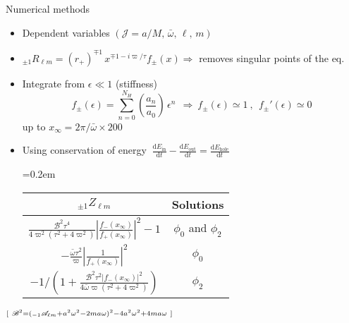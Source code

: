 \documentclass[9pt]{beamer}
\newcommand{\dd}{\mathrm{d}}
\newcommand{\uu}[3][]{ {}_{#1} #2_{#3} }
\begin{document}
\begin{frame}{Numerical methods}
	\begin{itemize}
		\setlength\itemsep{0.8em}

		\item Dependent variables $(\mathscr{J} = a/M, \,\bar{\omega}, \, \ell, \, m)$
		
		\item $\uu[\pm 1]{R}{\ell m} = (r_+)^{\mp 1} \, x^{ \mp 1 - i \varpi / \tau} f_{\pm}(x) \Rightarrow$ removes singular points of the eq.
		
		\item
		Integrate from $\epsilon\ll 1$ (stiffness) 
		$$ f_{\pm}(\epsilon) = \sum_{n=0}^{N_H} \left(\frac{a_n}{a_0}\right)
		\,\epsilon^n ~~\Rightarrow~ f_{\pm}{}(\epsilon) \simeq 1 ~,~~ f_{\pm}{}'(\epsilon) \simeq 0$$
		up to $x_\infty = 2\pi/\bar{\omega} \times 200$
		
		\item
		Using conservation of energy $~\frac{\dd E_\mathrm{in}}{\dd t} - \frac{\dd E_\mathrm{out}}{\dd t} = \frac{\dd E_\mathrm{hole}}{\dd t}$
		\\[0.2cm]
		\begin{center}
			\tabulinesep=0.2em
			\begin{tabu}{@{\hskip 0.25cm}c@{\hskip 0.75cm}c@{\hskip 0.75cm}}
				\hline
				$\uu[\pm 1]{Z}{\ell m}$ & Solutions \\
				\hline\hline
				$\frac{\mathscr{B}^2 \tau^4 }{4 \varpi^2 (\tau^2 + 4 \varpi^2)} \left| \frac{f_{-}(x_\infty)}{f_{+}(x_\infty)} \right|^2 - 1$ & 
				$\phi_0$ and $\phi_2$ \\
				\hline
				$- \frac{\bar{\omega} \tau^2}{\varpi} \left|\frac{1}{f_{+}(x_\infty)}\right|^2$ &
				$\phi_0$ \\
				\hline
				$-1\bigg/\left( 1 + \frac{\mathscr{B}^2 \tau^2 \left|f_{-}(x_\infty)\right|^2}{4 \bar{\omega} \varpi(\tau^2 + 4 \varpi^2)} \right)$ & $\phi_2$ \\
				\hline
			\end{tabu}
		\end{center}
	\end{itemize}
	\vspace*{0.15cm}
	$\hfill\scriptstyle [~ \mathscr{B}^2 = ( \uu[-1]{\mathscr{A}}{\ell m} + a^2\omega^2 - 2 m a \omega )^2 - 4 a^2\omega^2 + 4 m a \omega ~]$
\end{frame}
\end{document}
